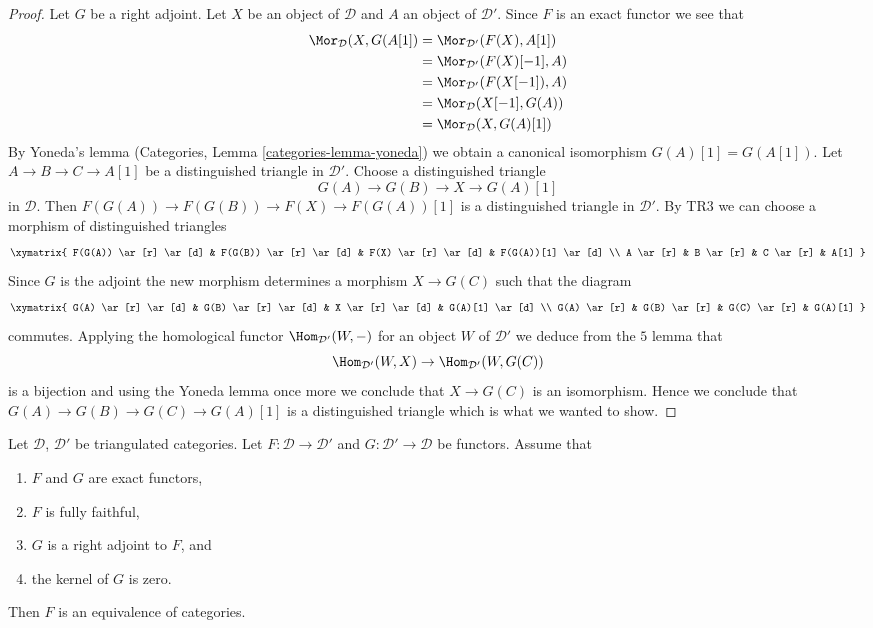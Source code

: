 \begin{proof}
Let $G$ be a right adjoint. Let $X$ be an object of $\mathcal{D}$ and
$A$ an object of $\mathcal{D}'$. Since $F$ is an exact functor we see that
\begin{align*}
\Mor_\mathcal{D}(X, G(A[1])
& =
\Mor_{\mathcal{D}'}(F(X), A[1]) \\
& =
\Mor_{\mathcal{D}'}(F(X)[-1], A) \\
& =
\Mor_{\mathcal{D}'}(F(X[-1]), A) \\
& =
\Mor_\mathcal{D}(X[-1], G(A)) \\
& =
\Mor_\mathcal{D}(X, G(A)[1])
\end{align*}
By Yoneda's lemma (Categories, Lemma \ref{categories-lemma-yoneda})
we obtain a canonical isomorphism $G(A)[1] = G(A[1])$.
Let $A \to B \to C \to A[1]$ be a distinguished triangle in $\mathcal{D}'$.
Choose a distinguished triangle
$$
G(A) \to G(B) \to X \to G(A)[1]
$$
in $\mathcal{D}$. Then $F(G(A)) \to F(G(B)) \to F(X) \to F(G(A))[1]$
is a distinguished triangle in $\mathcal{D}'$. By TR3 we can choose
a morphism of distinguished triangles
$$
\xymatrix{
F(G(A)) \ar[r] \ar[d] & F(G(B)) \ar[r] \ar[d] & F(X) \ar[r] \ar[d] &
F(G(A))[1] \ar[d] \\
A \ar[r] & B \ar[r] & C \ar[r] & A[1]
}
$$
Since $G$ is the adjoint the new morphism determines a morphism $X \to G(C)$
such that the diagram
$$
\xymatrix{
G(A) \ar[r] \ar[d] & G(B) \ar[r] \ar[d] & X \ar[r] \ar[d] & G(A)[1] \ar[d] \\
G(A) \ar[r] & G(B) \ar[r] & G(C) \ar[r] & G(A)[1]
}
$$
commutes. Applying the homological functor $\Hom_{\mathcal{D}'}(W, -)$
for an object $W$ of $\mathcal{D}'$ we deduce from the $5$ lemma that
$$
\Hom_{\mathcal{D}'}(W, X) \to \Hom_{\mathcal{D}'}(W, G(C))
$$
is a bijection and using the Yoneda lemma once more we conclude that
$X \to G(C)$ is an isomorphism. Hence we conclude that
$G(A) \to G(B) \to G(C) \to G(A)[1]$ is a distinguished triangle
which is what we wanted to show.
\end{proof}

\begin{lemma}
\label{lemma-fully-faithful-adjoint-kernel-zero}
Let $\mathcal{D}$, $\mathcal{D}'$ be triangulated categories.
Let $F : \mathcal{D} \to \mathcal{D}'$ and
$G : \mathcal{D}' \to \mathcal{D}$ be functors. Assume that
\begin{enumerate}
\item $F$ and $G$ are exact functors,
\item $F$ is fully faithful,
\item $G$ is a right adjoint to $F$, and
\item the kernel of $G$ is zero.
\end{enumerate}
Then $F$ is an equivalence of categories.
\end{lemma}

